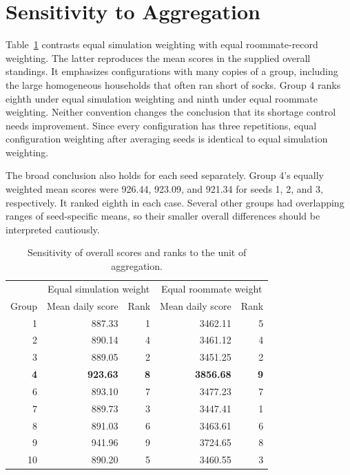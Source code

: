 \section{Sensitivity to Aggregation}
\label{app:weighting}

Table~\ref{tab:weighting} contrasts equal simulation weighting with equal roommate-record weighting. The latter reproduces the mean scores in the supplied overall standings. It emphasizes configurations with many copies of a group, including the large homogeneous households that often ran short of socks. Group 4 ranks eighth under equal simulation weighting and ninth under equal roommate weighting. Neither convention changes the conclusion that its shortage control needs improvement. Since every configuration has three repetitions, equal configuration weighting after averaging seeds is identical to equal simulation weighting.

The broad conclusion also holds for each seed separately. Group 4's equally weighted mean scores were 926.44, 923.09, and 921.34 for seeds 1, 2, and 3, respectively. It ranked eighth in each case. Several other groups had overlapping ranges of seed-specific means, so their smaller overall differences should be interpreted cautiously.

\begin{table}[htbp]
\centering
\begin{tabular}{rrrrr}
\toprule
& \multicolumn{2}{c}{Equal simulation weight} & \multicolumn{2}{c}{Equal roommate weight}\\
Group & Mean daily score & Rank & Mean daily score & Rank\\
\midrule
1 & 887.33 & 1 & 3462.11 & 5\\
2 & 890.14 & 4 & 3461.12 & 4\\
3 & 889.05 & 2 & 3451.25 & 2\\
\textbf{4} & \textbf{923.63} & \textbf{8} & \textbf{3856.68} & \textbf{9}\\
6 & 893.10 & 7 & 3477.23 & 7\\
7 & 889.73 & 3 & 3447.41 & 1\\
8 & 891.03 & 6 & 3463.61 & 6\\
9 & 941.96 & 9 & 3724.65 & 8\\
10 & 890.20 & 5 & 3460.55 & 3\\
\bottomrule
\end{tabular}
\caption{Sensitivity of overall scores and ranks to the unit of aggregation.}
\label{tab:weighting}
\end{table}
\FloatBarrier

